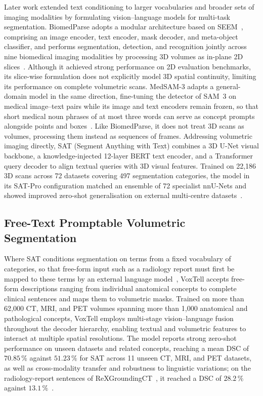 Later work extended text conditioning to larger vocabularies and broader sets of imaging modalities by formulating vision--language models for multi-task segmentation. BiomedParse adopts a modular architecture based on SEEM~\cite{zou2023segment}, comprising an image encoder, text encoder, mask decoder, and meta-object classifier, and performs segmentation, detection, and recognition jointly across nine biomedical imaging modalities by processing 3D volumes as in-plane 2D slices~\cite{zhao2025foundation-9de}. Although it achieved strong performance on 2D evaluation benchmarks, its slice-wise formulation does not explicitly model 3D spatial continuity, limiting its performance on complete volumetric scans. MedSAM-3 adapts a general-domain model in the same direction, fine-tuning the detector of SAM~3 on medical image--text pairs while its image and text encoders remain frozen, so that short medical noun phrases of at most three words can serve as concept prompts alongside points and boxes~\cite{liu2026medsam3delvingsegmentmedical}. Like BiomedParse, it does not treat 3D scans as volumes, processing them instead as sequences of frames. Addressing volumetric imaging directly, SAT (Segment Anything with Text) combines a 3D U-Net visual backbone, a knowledge-injected 12-layer BERT text encoder, and a Transformer query decoder to align textual queries with 3D visual features. Trained on 22,186 3D scans across 72 datasets covering 497 segmentation categories, the model in its SAT-Pro configuration matched an ensemble of 72 specialist nnU-Nets and showed improved zero-shot generalisation on external multi-centre datasets~\cite{zhao2025sat}.

\subsection{Free-Text Promptable Volumetric Segmentation}

Where SAT conditions segmentation on terms from a fixed vocabulary of categories, so that free-form input such as a radiology report must first be mapped to these terms by an external language model~\cite{zhao2025sat}, VoxTell accepts free-form descriptions ranging from individual anatomical concepts to complete clinical sentences and maps them to volumetric masks. Trained on more than 62,000 CT, MRI, and PET volumes spanning more than 1,000 anatomical and pathological concepts, VoxTell employs multi-stage vision--language fusion throughout the decoder hierarchy, enabling textual and volumetric features to interact at multiple spatial resolutions. The model reports strong zero-shot performance on unseen datasets and related concepts, reaching a mean DSC of $70.85\,\%$ against $51.23\,\%$ for SAT across 11 unseen CT, MRI, and PET datasets, as well as cross-modality transfer and robustness to linguistic variations; on the radiology-report sentences of ReXGroundingCT~\cite{baharoon2025rexgroundingct3dchestct}, it reached a DSC of $28.2\,\%$ against $13.1\,\%$~\cite{rokuss2025voxtellfreetextpromptableuniversal}.

